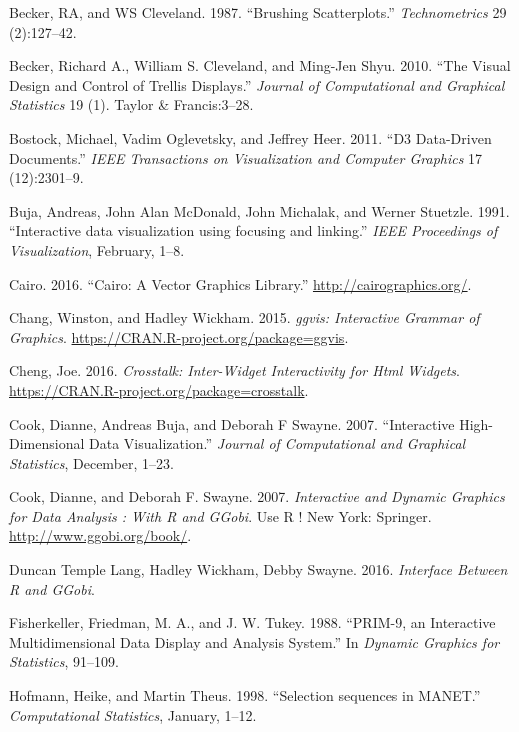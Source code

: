 \documentclass[12pt,]{article}
\theoremstyle{definition}
\theoremstyle{definition}
\theoremstyle{definition}
\theoremstyle{remark}
\begin{document}
\leavevmode\hypertarget{ref-brushing-scatterplots}{}%
Becker, RA, and WS Cleveland. 1987. ``Brushing Scatterplots.''
\emph{Technometrics} 29 (2):127--42.

\leavevmode\hypertarget{ref-trellis}{}%
Becker, Richard A., William S. Cleveland, and Ming-Jen Shyu. 2010. ``The
Visual Design and Control of Trellis Displays.'' \emph{Journal of
Computational and Graphical Statistics} 19 (1). Taylor \& Francis:3--28.

\leavevmode\hypertarget{ref-d3}{}%
Bostock, Michael, Vadim Oglevetsky, and Jeffrey Heer. 2011. ``D3
Data-Driven Documents.'' \emph{IEEE Transactions on Visualization and
Computer Graphics} 17 (12):2301--9.

\leavevmode\hypertarget{ref-Buja:1991vh}{}%
Buja, Andreas, John Alan McDonald, John Michalak, and Werner Stuetzle.
1991. ``Interactive data visualization using focusing and linking.''
\emph{IEEE Proceedings of Visualization}, February, 1--8.

\leavevmode\hypertarget{ref-cairo}{}%
Cairo. 2016. ``Cairo: A Vector Graphics Library.''
\url{http://cairographics.org/}.

\leavevmode\hypertarget{ref-ggvis}{}%
Chang, Winston, and Hadley Wickham. 2015. \emph{ggvis: Interactive
Grammar of Graphics}. \url{https://CRAN.R-project.org/package=ggvis}.

\leavevmode\hypertarget{ref-crosstalk}{}%
Cheng, Joe. 2016. \emph{Crosstalk: Inter-Widget Interactivity for Html
Widgets}. \url{https://CRAN.R-project.org/package=crosstalk}.

\leavevmode\hypertarget{ref-Cook:2007uk}{}%
Cook, Dianne, Andreas Buja, and Deborah F Swayne. 2007. ``Interactive
High-Dimensional Data Visualization.'' \emph{Journal of Computational
and Graphical Statistics}, December, 1--23.

\leavevmode\hypertarget{ref-ggobi:2007}{}%
Cook, Dianne, and Deborah F. Swayne. 2007. \emph{Interactive and Dynamic
Graphics for Data Analysis : With R and GGobi}. Use R ! New York:
Springer. \url{http://www.ggobi.org/book/}.

\leavevmode\hypertarget{ref-rggobi}{}%
Duncan Temple Lang, Hadley Wickham, Debby Swayne. 2016. \emph{Interface
Between R and GGobi}.

\leavevmode\hypertarget{ref-PRIM9}{}%
Fisherkeller, Friedman, M. A., and J. W. Tukey. 1988. ``PRIM-9, an
Interactive Multidimensional Data Display and Analysis System.'' In
\emph{Dynamic Graphics for Statistics}, 91--109.

\leavevmode\hypertarget{ref-sequences}{}%
Hofmann, Heike, and Martin Theus. 1998. ``Selection sequences in
MANET.'' \emph{Computational Statistics}, January, 1--12.
\end{document}
